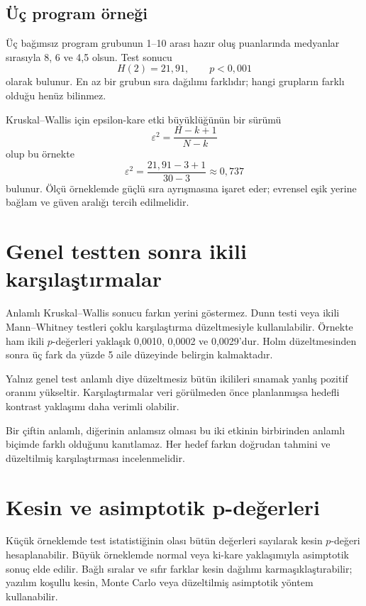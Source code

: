 \subsection{Üç program örneği}

Üç bağımsız program grubunun 1--10 arası hazır oluş puanlarında medyanlar
sırasıyla 8, 6 ve 4,5 olsun. Test sonucu
\[
H(2)=21{,}91,
\qquad p<0{,}001
\]
olarak bulunur. En az bir grubun sıra dağılımı farklıdır; hangi grupların
farklı olduğu henüz bilinmez.

Kruskal--Wallis için epsilon-kare etki büyüklüğünün bir sürümü
\[
\varepsilon^2=\frac{H-k+1}{N-k}
\]
olup bu örnekte
\[
\varepsilon^2
=\frac{21{,}91-3+1}{30-3}
\approx0{,}737
\]
bulunur. Ölçü örneklemde güçlü sıra ayrışmasına işaret eder; evrensel eşik
yerine bağlam ve güven aralığı tercih edilmelidir.

\section{Genel testten sonra ikili karşılaştırmalar}

Anlamlı Kruskal--Wallis sonucu farkın yerini göstermez. Dunn testi veya ikili
Mann--Whitney testleri çoklu karşılaştırma düzeltmesiyle kullanılabilir.
Örnekte ham ikili $p$-değerleri yaklaşık 0,0010, 0,0002 ve 0,0029'dur. Holm
düzeltmesinden sonra üç fark da yüzde 5 aile düzeyinde belirgin kalmaktadır.

Yalnız genel test anlamlı diye düzeltmesiz bütün ikilileri sınamak yanlış
pozitif oranını yükseltir. Karşılaştırmalar veri görülmeden önce planlanmışsa
hedefli kontrast yaklaşımı daha verimli olabilir.

\begin{mistakebox}
Bir çiftin anlamlı, diğerinin anlamsız olması bu iki etkinin birbirinden
anlamlı biçimde farklı olduğunu kanıtlamaz. Her hedef farkın doğrudan tahmini
ve düzeltilmiş karşılaştırması incelenmelidir.
\end{mistakebox}

\section{Kesin ve asimptotik p-değerleri}

Küçük örneklemde test istatistiğinin olası bütün değerleri sayılarak kesin
$p$-değeri hesaplanabilir. Büyük örneklemde normal veya ki-kare yaklaşımıyla
asimptotik sonuç elde edilir. Bağlı sıralar ve sıfır farklar kesin dağılımı
karmaşıklaştırabilir; yazılım koşullu kesin, Monte Carlo veya düzeltilmiş
asimptotik yöntem kullanabilir.

